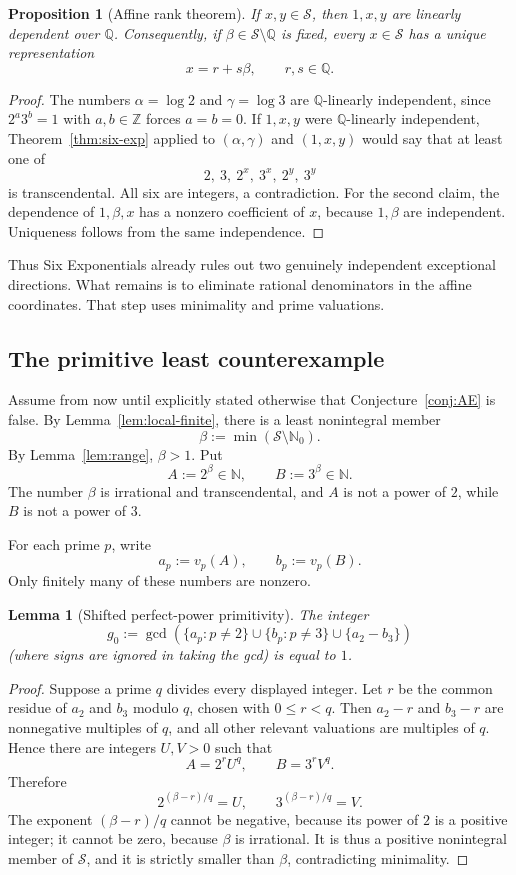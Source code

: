 \documentclass[11pt]{article}
\newtheorem{lemma}[theorem]{Lemma}
\newtheorem{proposition}[theorem]{Proposition}
\theoremstyle{definition}
\newcommand{\N}{\mathbb N}
\newcommand{\Nzero}{\mathbb N_0}
\newcommand{\Z}{\mathbb Z}
\newcommand{\Q}{\mathbb Q}
\begin{document}
\begin{proposition}[Affine rank theorem]\label{prop:affine-rank}
If $x,y\in\mathcal S$, then $1,x,y$ are linearly dependent over $\Q$.
Consequently, if $\beta\in\mathcal S\setminus\Q$ is fixed, every
$x\in\mathcal S$ has a unique representation
\[
  x=r+s\beta,\qquad r,s\in\Q.
\]
\end{proposition}
\begin{proof}
The numbers $\alpha=\log2$ and $\gamma=\log3$ are $\Q$-linearly independent,
since $2^a3^b=1$ with $a,b\in\Z$ forces $a=b=0$.  If $1,x,y$ were
$\Q$-linearly independent, Theorem~\ref{thm:six-exp} applied to
$(\alpha,\gamma)$ and $(1,x,y)$ would say that at least one of
\[
  2,\ 3,\ 2^x,\ 3^x,\ 2^y,\ 3^y
\]
is transcendental.  All six are integers, a contradiction.  For the second
claim, the dependence of $1,\beta,x$ has a nonzero coefficient of $x$, because
$1,\beta$ are independent.  Uniqueness follows from the same independence.
\end{proof}

Thus Six Exponentials already rules out two genuinely independent exceptional
directions.  What remains is to eliminate rational denominators in the affine
coordinates.  That step uses minimality and prime valuations.

\subsection{The primitive least counterexample}

Assume from now until explicitly stated otherwise that Conjecture~\ref{conj:AE}
is false.  By Lemma~\ref{lem:local-finite}, there is a least nonintegral member
\[
  \beta:=\min(\mathcal S\setminus\Nzero).
\]
By Lemma~\ref{lem:range}, $\beta>1$.  Put
\[
  A:=2^\beta\in\N,\qquad B:=3^\beta\in\N.
\]
The number $\beta$ is irrational and transcendental, and $A$ is not a power of
$2$, while $B$ is not a power of $3$.

For each prime $p$, write
\[
  a_p:=v_p(A),\qquad b_p:=v_p(B).
\]
Only finitely many of these numbers are nonzero.

\begin{lemma}[Shifted perfect-power primitivity]\label{lem:primitive-gcd}
The integer
\[
 g_0:=\gcd\!\left(
   \{a_p:p\ne2\}\cup\{b_p:p\ne3\}\cup\{a_2-b_3\}
 \right)
\]
(where signs are ignored in taking the gcd) is equal to $1$.
\end{lemma}
\begin{proof}
Suppose a prime $q$ divides every displayed integer.  Let $r$ be the common
residue of $a_2$ and $b_3$ modulo $q$, chosen with $0\le r<q$.  Then
$a_2-r$ and $b_3-r$ are nonnegative multiples of $q$, and all other relevant
valuations are multiples of $q$.  Hence there are integers $U,V>0$ such that
\[
  A=2^rU^q,\qquad B=3^rV^q.
\]
Therefore
\[
  2^{(\beta-r)/q}=U,\qquad 3^{(\beta-r)/q}=V.
\]
The exponent $(\beta-r)/q$ cannot be negative, because its power of $2$ is a
positive integer; it cannot be zero, because $\beta$ is irrational.  It is thus
a positive nonintegral member of $\mathcal S$, and it is strictly smaller than
$\beta$, contradicting minimality.
\end{proof}
\end{document}
